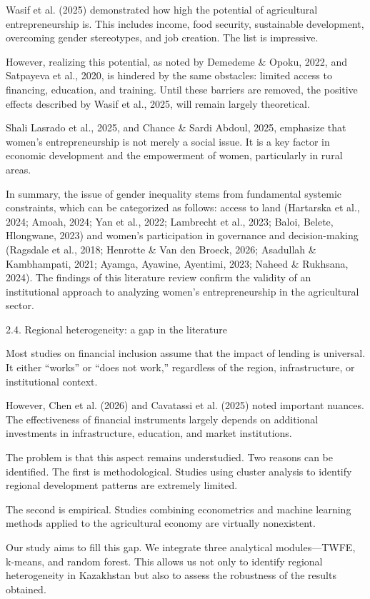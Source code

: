 \documentclass[
]{article}
\begin{document}
Wasif et al. (2025) demonstrated how high the potential of agricultural
entrepreneurship is. This includes income, food security, sustainable
development, overcoming gender stereotypes, and job creation. The list
is impressive.

However, realizing this potential, as noted by Demedeme \& Opoku, 2022,
and Satpayeva et al., 2020, is hindered by the same obstacles: limited
access to financing, education, and training. Until these barriers are
removed, the positive effects described by Wasif et al., 2025, will
remain largely theoretical.

Shali Lasrado et al., 2025, and Chance \& Sardi Abdoul, 2025, emphasize
that women's entrepreneurship is not merely a social issue. It is a key
factor in economic development and the empowerment of women,
particularly in rural areas.

In summary, the issue of gender inequality stems from fundamental
systemic constraints, which can be categorized as follows: access to
land (Hartarska et al., 2024; Amoah, 2024; Yan et al., 2022; Lambrecht
et al., 2023; Baloi, Belete, Hlongwane, 2023) and women's participation
in governance and decision-making (Ragsdale et al., 2018; Henrotte \&
Van den Broeck, 2026; Asadullah \& Kambhampati, 2021; Ayamga, Ayawine,
Ayentimi, 2023; Naheed \& Rukhsana, 2024). The findings of this
literature review confirm the validity of an institutional approach to
analyzing women's entrepreneurship in the agricultural sector.

2.4. Regional heterogeneity: a gap in the literature

Most studies on financial inclusion assume that the impact of lending is
universal. It either ``works'' or ``does not work,'' regardless of the
region, infrastructure, or institutional context.

However, Chen et al. (2026) and Cavatassi et al. (2025) noted important
nuances. The effectiveness of financial instruments largely depends on
additional investments in infrastructure, education, and market
institutions.

The problem is that this aspect remains understudied. Two reasons can be
identified. The first is methodological. Studies using cluster analysis
to identify regional development patterns are extremely limited.

The second is empirical. Studies combining econometrics and machine
learning methods applied to the agricultural economy are virtually
nonexistent.

Our study aims to fill this gap. We integrate three analytical
modules---TWFE, k-means, and random forest. This allows us not only to
identify regional heterogeneity in Kazakhstan but also to assess the
robustness of the results obtained.
\end{document}

